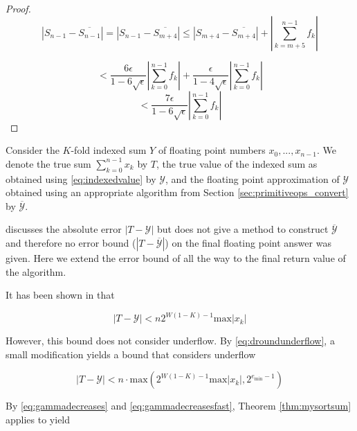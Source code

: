 \documentclass[12pt]{article}
\providecommand{\min}{\ensuremath{\text{min}}}
\providecommand{\max}{\ensuremath{\text{max}}}
\theoremstyle{definition}
\numberwithin{equation}{section}
\numberwithin{figure}{section}
\begin{document}
\begin{proof}
        \begin{equation*}
          |S_{n - 1} - \overline{S_{n - 1}}| = |S_{n - 1} - \overline{S_{m + 4}}| \leq |S_{m + 4} - \overline{S_{m + 4}}| + |\sum\limits_{k = m + 5}^{n - 1}f_k|
        \end{equation*}

        \begin{equation*}
          < \frac{6\epsilon}{1 - 6\sqrt\epsilon}|\sum\limits_{k = 0}^{n - 1}f_k| + \frac{\epsilon}{1 - 4\sqrt\epsilon}|\sum\limits_{k = 0}^{n - 1} f_k|
        \end{equation*}
        \begin{equation*}
          < \frac{7\epsilon}{1 - 6\sqrt\epsilon}|\sum\limits_{k = 0}^{n - 1}f_k|
        \end{equation*}
    \end{proof}

    Consider the $K$-fold indexed sum $Y$ of floating point numbers $x_0, ..., x_{n - 1}$. We denote the true sum $\sum \limits_{k = 0}^{n - 1} x_k$ by $T$, the true value of the indexed sum as obtained using  \eqref{eq:indexedvalue} by $\mathcal{Y}$, and the floating point approximation of $\mathcal{Y}$ obtained using an appropriate algorithm from Section \ref{sec:primitiveops_convert} by $\overline{\mathcal{Y}}$.

    \cite{repsum} discusses the absolute error $|T - \mathcal{Y}|$ but does not give a method to construct $\overline{\mathcal{Y}}$ and therefore no error bound ($|T - \overline{\mathcal{Y}}|$) on the final floating point answer was given. Here we extend the error bound of \cite{repsum} all the way to the final return value of the algorithm.

    It has been shown in \cite{repsum} that

    \begin{equation}
      \label{eq:repboundnaive}
      |T - \mathcal{Y}| < n  2^{W  (1 - K) - 1}\max|x_k|
    \end{equation}

    However, this bound does not consider underflow. By  \eqref{eq:droundunderflow}, a small modification yields a bound that considers underflow

    \begin{equation}
      \label{eq:repbound}
      |T - \mathcal{Y}| < n \cdot \max(2^{W  (1 - K) - 1} \max|x_k|, 2^{e_{\min} - 1})
    \end{equation}

    By  \eqref{eq:gammadecreases} and \eqref{eq:gammadecreasesfast}, Theorem \ref{thm:mysortsum} applies to yield
\end{document}
